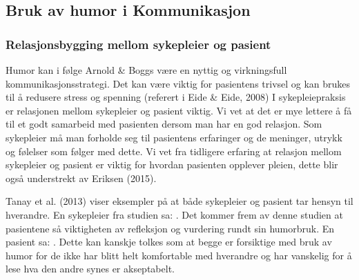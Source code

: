 \subsection{Bruk av humor i Kommunikasjon}

\subsubsection{Relasjonsbygging mellom sykepleier og pasient}

Humor kan i følge Arnold \&{} Boggs være en nyttig og virkningsfull
kommunikasjonsstrategi. Det kan være viktig for pasientens trivsel og kan
brukes til å redusere stress og spenning (referert i Eide \&{} Eide, 2008) I
sykepleiepraksis er relasjonen mellom sykepleier og pasient viktig. Vi vet at
det er mye lettere å få til et godt samarbeid med pasienten dersom man har en
god relasjon. Som sykepleier må man forholde seg til pasientens erfaringer og
de meninger, utrykk og følelser som følger med dette. Vi vet fra tidligere
erfaring at relasjon mellom sykepleier og pasient er viktig for hvordan
pasienten opplever pleien, dette blir også understrekt av Eriksen (2015).

Tanay et al. (2013) viser eksempler på at både sykepleier og pasient tar hensyn
til hverandre. En sykepleier fra studien sa: . Det kommer frem av denne studien at
pasientene så viktigheten av refleksjon og vurdering rundt sin humorbruk. En
pasient sa: .  Dette
kan kanskje tolkes som at begge er forsiktige med bruk av humor for de ikke har
blitt helt komfortable med hverandre og har vanskelig for å lese hva den andre
synes er akseptabelt.

